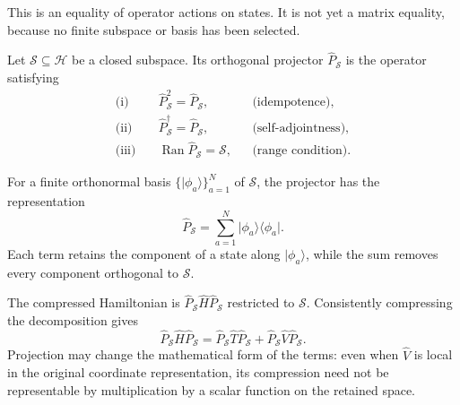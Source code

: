 This is an equality of operator actions on states. It is not yet a matrix
equality, because no finite subspace or basis has been selected.

\begin{definition}

Let $\mathcal S\subseteq\mathcal H$ be a closed subspace. Its orthogonal
projector $\hat P_{\mathcal S}$ is the operator satisfying
\begin{equation}
\begin{aligned}
    \text{(i)}\quad
    &\hat P_{\mathcal S}^{2}=\hat P_{\mathcal S},
    &&\text{(idempotence)},\\
    \text{(ii)}\quad
    &\hat P_{\mathcal S}^{\dagger}=\hat P_{\mathcal S},
    &&\text{(self-adjointness)},\\
    \text{(iii)}\quad
    &\operatorname{Ran}\hat P_{\mathcal S}=\mathcal S,
    &&\text{(range condition)}.
\end{aligned}
\end{equation}
\end{definition}

For a finite orthonormal basis
$\{\lvert\phi_a\rangle\}_{a=1}^{N}$ of $\mathcal S$, the projector has the
representation
\begin{equation}
    \hat P_{\mathcal S}
    =
    \sum_{a=1}^{N}
    \lvert\phi_a\rangle\langle\phi_a\rvert.
\end{equation}
Each term retains the component of a state along
$\lvert\phi_a\rangle$, while the sum removes every component orthogonal to
$\mathcal S$.

The compressed Hamiltonian is
$\hat P_{\mathcal S}\hat H\hat P_{\mathcal S}$ restricted to $\mathcal S$.
Consistently compressing the decomposition gives
\begin{equation}
    \hat P_{\mathcal S}\hat H\hat P_{\mathcal S}
    =
    \hat P_{\mathcal S}\hat T\hat P_{\mathcal S}
    +
    \hat P_{\mathcal S}\hat V\hat P_{\mathcal S}.
\end{equation}
Projection may change the mathematical form of the terms: even when $\hat V$
is local in the original coordinate representation, its compression need not
be representable by multiplication by a scalar function on the retained
space.


